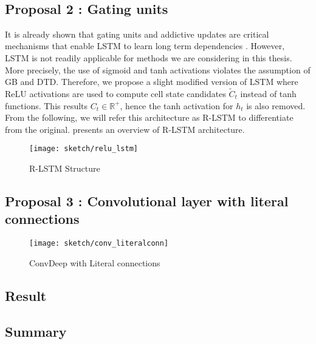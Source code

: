\begin{figure}
\centering
{} \\

\end{figure}

\subsection{Proposal 2 : Gating units}
It is already shown that gating units and addictive updates are critical mechanisms that enable LSTM to learn long term dependencies \cite{GreffLSTMsearchspace2017, Jozefowiczempiricalexplorationrecurrent2015a}. However, LSTM is not readily applicable for methods we are considering in this thesis. More precisely, the use of sigmoid and tanh activations violates the assumption of GB and DTD. Therefore, we propose a slight modified version of LSTM where ReLU activations are used to compute cell state candidates $\widetilde{C}_t$ instead of tanh functions. This results $C_t \in \mathbb{R}^+$, hence the tanh activation for $h_t$  is also removed.  From the following, we will refer this architecture as R-LSTM to differentiate from the original.  \addfigure{\ref{fig:relu_lstm}} presents an overview of R-LSTM architecture.

\begin{figure}[h]
\centering
\texttt{[image: sketch/relu\_lstm]}
\caption{R-LSTM Structure} 

\label{fig:relu_lstm} 
\end{figure}



%

\subsection{Proposal 3 : Convolutional layer with literal connections}


 \begin{figure}[h]
\centering
\texttt{[image: sketch/conv\_literalconn]}
\caption{ConvDeep with Literal connections} 
\label{fig:conv_literalconn}
\end{figure}

\subsection{Result}

\subsection{Summary}